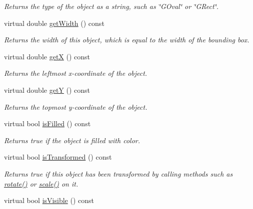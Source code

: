 \begin{DoxyCompactItemize}
\begin{DoxyCompactList}\small\item\em Returns the type of the object as a string, such as {\ttfamily \char`\"{}\+G\+Oval\char`\"{}} or {\ttfamily \char`\"{}\+G\+Rect\char`\"{}}. \end{DoxyCompactList}\item 
virtual double \mbox{\hyperlink{classsgl_1_1GObject_a0ed2965abd4f5701d2cadf71239faf19}{get\+Width}} () const
\begin{DoxyCompactList}\small\item\em Returns the width of this object, which is equal to the width of the bounding box. \end{DoxyCompactList}\item 
virtual double \mbox{\hyperlink{classsgl_1_1GObject_a344385751bee0720059403940d57a13e}{getX}} () const
\begin{DoxyCompactList}\small\item\em Returns the leftmost {\itshape x}-\/coordinate of the object. \end{DoxyCompactList}\item 
virtual double \mbox{\hyperlink{classsgl_1_1GObject_aafa51c7f8f38a09febbb9ce7853f77b4}{getY}} () const
\begin{DoxyCompactList}\small\item\em Returns the topmost {\itshape y}-\/coordinate of the object. \end{DoxyCompactList}\item 
virtual bool \mbox{\hyperlink{classsgl_1_1GObject_a11c404f106940c201b6f326e0355c150}{is\+Filled}} () const
\begin{DoxyCompactList}\small\item\em Returns {\ttfamily true} if the object is filled with color. \end{DoxyCompactList}\item 
virtual bool \mbox{\hyperlink{classsgl_1_1GObject_a9de207581cfa4ca1eaa06da5f29b75fc}{is\+Transformed}} () const
\begin{DoxyCompactList}\small\item\em Returns {\ttfamily true} if this object has been transformed by calling methods such as \mbox{\hyperlink{classsgl_1_1GObject_ae1ffaa12185dfd5ba464f7d87c329e26}{rotate()}} or \mbox{\hyperlink{classsgl_1_1GObject_ad2e1900f730475c2d044817db03b38d6}{scale()}} on it. \end{DoxyCompactList}\item 
virtual bool \mbox{\hyperlink{classsgl_1_1GObject_a9d8a6cfb13917785c143e74d40e4e2be}{is\+Visible}} () const

\end{DoxyCompactItemize}

